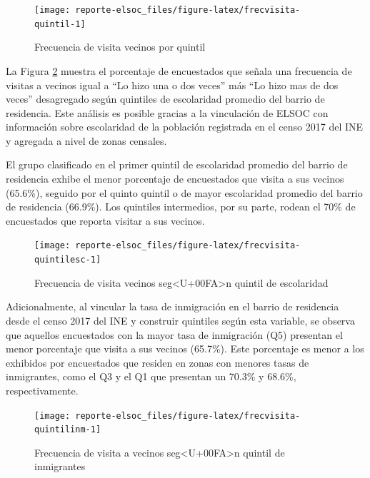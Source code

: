 \documentclass[
  12pt,
]{book}
\begin{document}
\begin{figure}

{\centering \texttt{[image: reporte-elsoc\_files/figure-latex/frecvisita-quintil-1]} 

}

\caption{Frecuencia de visita vecinos por quintil}\label{fig:frecvisita-quintil}
\end{figure}

La Figura \ref{fig:frecvisita-quintilesc} muestra el porcentaje de encuestados que señala una frecuencia de visitas a vecinos igual a ``Lo hizo una o dos veces'' más ``Lo hizo mas de dos veces'' desagregado según quintiles de escolaridad promedio del barrio de residencia. Este análisis es posible gracias a la vinculación de ELSOC con información sobre escolaridad de la población registrada en el censo 2017 del INE y agregada a nivel de zonas censales.

El grupo clasificado en el primer quintil de escolaridad promedio del barrio de residencia exhibe el menor porcentaje de encuestados que visita a sus vecinos (65.6\%), seguido por el quinto quintil o de mayor escolaridad promedio del barrio de residencia (66.9\%). Los quintiles intermedios, por su parte, rodean el 70\% de encuestados que reporta visitar a sus vecinos.

\begin{figure}

{\centering \texttt{[image: reporte-elsoc\_files/figure-latex/frecvisita-quintilesc-1]} 

}

\caption{Frecuencia de visita vecinos seg<U+00FA>n quintil de  escolaridad}\label{fig:frecvisita-quintilesc}
\end{figure}

Adicionalmente, al vincular la tasa de inmigración en el barrio de residencia desde el censo 2017 del INE y construir quintiles según esta variable, se observa que aquellos encuestados con la mayor tasa de inmigración (Q5) presentan el menor porcentaje que visita a sus vecinos (65.7\%). Este porcentaje es menor a los exhibidos por encuestados que residen en zonas con menores tasas de inmigrantes, como el Q3 y el Q1 que presentan un 70.3\% y 68.6\%, respectivamente.

\begin{figure}

{\centering \texttt{[image: reporte-elsoc\_files/figure-latex/frecvisita-quintilinm-1]} 

}

\caption{Frecuencia de visita a vecinos seg<U+00FA>n quintil de inmigrantes}\label{fig:frecvisita-quintilinm}
\end{figure}
\end{document}
